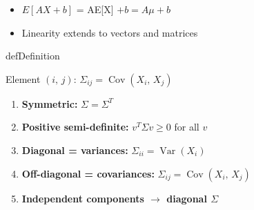 
\begin{itemize}
\tightlist
\item
  $E[AX + b]$ = AE[X] $+ b = A\mu + b$
\item
  Linearity extends to vectors and matrices
\end{itemize}


\begin{PSbox}[unbreakable]{def}{Definition}


Element $(i,\,j)$: $\Sigma_{ij} = \operatorname{Cov}(X_{i},\, X_{j})$


\end{PSbox}


\begin{enumerate}
\def\labelenumi{\arabic{enumi}.}
\tightlist
\item
  \textbf{Symmetric:} $\Sigma = \Sigma^{T}$
\item
  \textbf{Positive semi-definite:} $v^{T}\Sigma v \ge 0$ for all $v$
\item
  \textbf{Diagonal = variances:} $\Sigma_{ii} = \operatorname{Var}(X_{i})$
\item
  \textbf{Off-diagonal = covariances:} $\Sigma_{ij} = \operatorname{Cov}(X_{i},\, X_{j})$
\item
  \textbf{Independent components \ensuremath{\to} diagonal $\Sigma$}
\end{enumerate}




